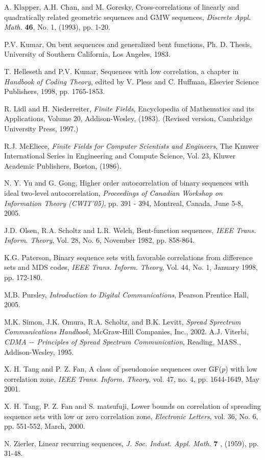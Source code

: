 \documentclass{article}
\begin{document}
\begin{thebibliography}{1}
 A. Klapper, A.H. Chan, and M. Goresky, Cross-correlations of
linearly and quadratically related geometric sequences and GMW
sequences, {\em Discrete Appl. Math.} {\bf 46}, No. 1, (1993), pp.
 1-20.

 P.V.  Kumar, On bent sequences and generalized bent functions, Ph. D. Thesis,
 University of Southern California, Los Angeles, 1983.

 T. Helleseth and P.V. Kumar, Sequences with low correlation, a
chapter in  {\em Handbook of Coding Theory}, edited by V. Pless
and C. Huffman, Elsevier Science Publishers,  1998, pp. 1765-1853.



 R. Lidl and H. Niederreiter,
{\em Finite Fields}, Encyclopedia of Mathematics and its
Applications, Volume 20, Addison-Wesley, (1983). (Revised version,
Cambridge University Press, 1997.)


 R.J. McEliece, {\em Finite Fields for Computer Scientists and
Engineers}, The Knuwer International Series in Engineering and
Compute Science, Vol. 23,  Kluwer Academic Publishers, Boston,
(1986).

 N. Y. Yu and G. Gong, Higher order autocorrelation of binary sequences with ideal two-level autocorrelation, {\em Proceedings of Canadian Workshop on Information Theory (CWIT'05)}, pp. 391 - 394, Montreal, Canada, June 5-8, 2005.

 J.D. Olsen, R.A. Scholtz and L.R. Welch, Bent-function
sequences, {\em IEEE Trans. Inform. Theory}, Vol. 28, No. 6,
November 1982, pp. 858-864.



 K.G. Paterson, Binary sequence sets with
favorable correlations from difference sets and MDS codes, {\em
IEEE Trans. Inform. Theory}, Vol. 44,  No. 1, January 1998, pp.
 172-180.

  M.B. Pursley, {\em Introduction to Digital
Communications}, Pearson Prentice Hall, 2005.

 M.K. Simon, J.K. Omura, R.A. Scholtz, and B.K.
Levitt, {\em Spread Sprectrum Communications Handbook},
McGraw-Hill Companies, Inc., 2002.
 A.J. Viterbi, {\em CDMA $-$ Principles of Spread Spectrum Communication}, Reading, MASS., Addison-Wesley, 1995.


 X. H. Tang and P. Z. Fan,  A class of pseudonoise sequences over GF($p$) with low correlation zone,  {\em IEEE Trans. Inform. Theory}, vol. 47, no. 4, pp. 1644-1649, May 2001.

 X. H. Tang, P. Z. Fan and S. matsufuji,  Lower bounds on correlation of spreading sequence sets with low or zero correlation zone,  {\em Electronic Letters}, vol. 36, No. 6, pp. 551-552, March, 2000.

 N. Zierler, Linear recurring sequences, {\em J. Soc. Indust. Appl. Math.}
{\bf 7} , (1959), pp. 31-48.




\end{thebibliography}
\end{document}
